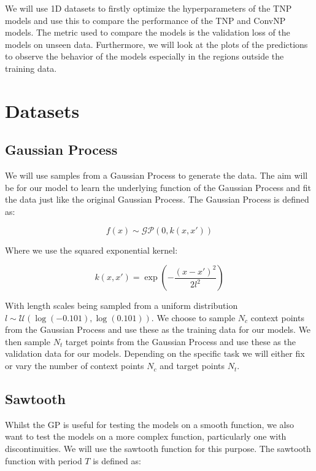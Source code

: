 \documentclass[../../main.tex]{subfiles}
\begin{document}
We will use 1D datasets to firstly optimize the hyperparameters of the TNP models and use this to compare the performance of the TNP and ConvNP models. The metric used to compare the models is the validation loss of the models on unseen data. Furthermore, we will look at the plots of the predictions to observe the behavior of the models especially in the regions outside the training data.


\section{Datasets}

\subsection{Gaussian Process}

We will use samples from a Gaussian Process to generate the data. The aim will be for our model to learn the underlying function of the Gaussian Process and fit the data just like the original Gaussian Process. The Gaussian Process is defined as:

\begin{equation}
	f(x) \sim \mathcal{GP}(0, k(x, x'))
\end{equation}

Where we use the squared exponential kernel:

\begin{equation}
	k(x, x') = \exp\left(-\frac{(x - x')^2}{2l^2}\right)
\end{equation}

With length scales being sampled from a uniform distribution $l \sim \mathcal{U}(\log(-0.101), \log(0.101))$. We choose to sample $N_c$ context points from the Gaussian Process and use these as the training data for our models. We then sample $N_t$ target points from the Gaussian Process and use these as the validation data for our models. Depending on the specific task we will either fix or vary the number of context points $N_c$ and target points $N_t$.


\subsection{Sawtooth}

Whilst the GP is useful for testing the models on a smooth function, we also want to test the models on a more complex function, particularly one with discontinuities. We will use the sawtooth function for this purpose. The sawtooth function with period $T$ is defined as:
\end{document}
